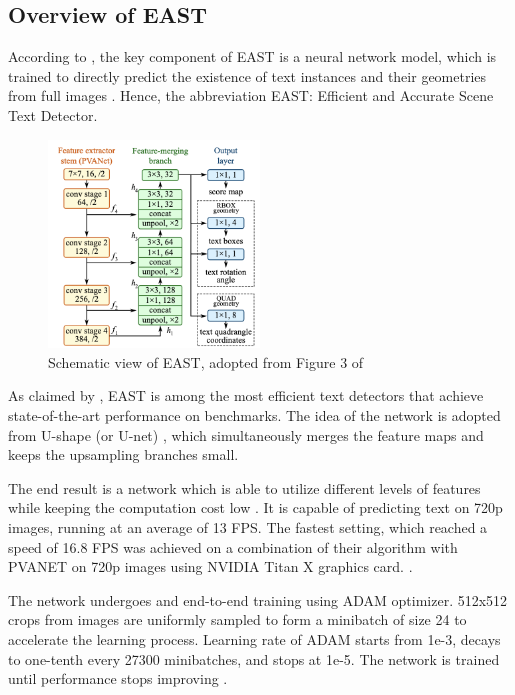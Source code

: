 \documentclass[10pt, a4paper]{article}
\begin{document}
\subsection{Overview of EAST} %
\label{sub:overvieweast}
According to \cite{EastZhouEtAl}, the key component of EAST is a neural network model, which is trained to directly predict the existence of text instances and their geometries from full images \citep{EastZhouEtAl}.
Hence, the abbreviation EAST: Efficient and Accurate Scene Text Detector.
\begin{figure}[hbt!]
	\centering
	\includegraphics[width=0.5\textwidth]{img/eaststructure.png}
	\caption{Schematic view of EAST, adopted from Figure 3 of~\protect\cite{EastZhouEtAl}}
	\label{fig:east1}
\end{figure}

As claimed by \cite{EastZhouEtAl}, EAST is among the most efficient text detectors that achieve state-of-the-art performance on benchmarks.
The idea of the network is adopted from U-shape (or U-net) \citep{unet}, which simultaneously merges the feature maps and keeps the upsampling branches small. 

The end result is a network which is able to utilize different levels of features while keeping the computation cost low \citep{EastZhouEtAl}.
It is capable of predicting text on 720p images, running at an average of 13 FPS. The fastest setting, which reached a speed of 16.8 FPS was achieved on a combination of their algorithm with PVANET on 720p images using NVIDIA Titan X graphics card. \citep{EastZhouEtAl}.

The network undergoes and end-to-end training using ADAM \citep{adam} optimizer. 512x512 crops from images are uniformly sampled to form a minibatch of size 24 to accelerate the learning process.
Learning rate of ADAM starts from 1e-3, decays to one-tenth every 27300 minibatches, and stops at 1e-5. The network is trained until performance stops improving \citep{EastZhouEtAl}.
\end{document}
